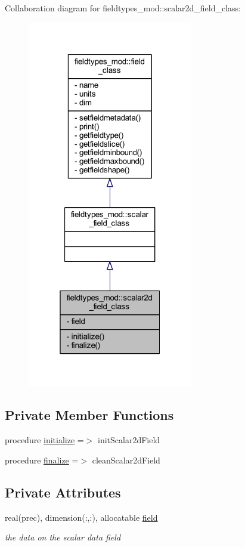Collaboration diagram for fieldtypes\+\_\+mod\+:\+:scalar2d\+\_\+field\+\_\+class\+:\nopagebreak
\begin{figure}[H]
\begin{center}
\leavevmode
\includegraphics[width=205pt]{structfieldtypes__mod_1_1scalar2d__field__class__coll__graph}
\end{center}
\end{figure}
\subsection*{Private Member Functions}
\begin{DoxyCompactItemize}
\item 
procedure \mbox{\hyperlink{structfieldtypes__mod_1_1scalar2d__field__class_ad351be43d28cb9fc0a7cbb8874315276}{initialize}} =$>$ init\+Scalar2d\+Field
\item 
procedure \mbox{\hyperlink{structfieldtypes__mod_1_1scalar2d__field__class_ae4b29ecca102f1ad00b9a3aabd5effc3}{finalize}} =$>$ clean\+Scalar2d\+Field
\end{DoxyCompactItemize}
\subsection*{Private Attributes}
\begin{DoxyCompactItemize}
\item 
real(prec), dimension(\+:,\+:), allocatable \mbox{\hyperlink{structfieldtypes__mod_1_1scalar2d__field__class_a4c3879389ef1af4e218544a5acc3215d}{field}}
\begin{DoxyCompactList}\small\item\em the data on the scalar data field \end{DoxyCompactList}\end{DoxyCompactItemize}


